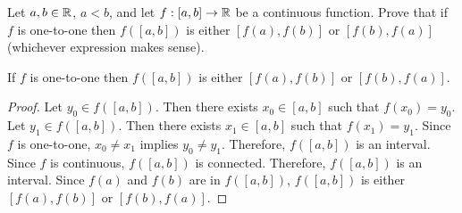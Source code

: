\begin{problem}
  Let $a, b \in \mathbb{R}$, $a < b$, and let $f : [a, b] \to \mathbb{R}$ be a continuous function.
  Prove that if $f$ is one-to-one then $f([a, b])$ is either
  $[f(a), f(b)]$ or $[f(b), f(a)]$ (whichever expression makes sense).
\end{problem}
\begin{answer}
  \begin{claim}
    If $f$ is one-to-one then $f([a, b])$ is either
    $[f(a), f(b)]$ or $[f(b), f(a)]$.
    \begin{proof}
      Let $y_0 \in f([a, b])$.
      Then there exists $x_0 \in [a, b]$ such that $f(x_0) = y_0$.
      Let $y_1 \in f([a, b])$.
      Then there exists $x_1 \in [a, b]$ such that $f(x_1) = y_1$.
      Since $f$ is one-to-one, $x_0 \neq x_1$ implies $y_0 \neq y_1$.
      Therefore, $f([a, b])$ is an interval.
      Since $f$ is continuous, $f([a, b])$ is connected.
      Therefore, $f([a, b])$ is an interval.
      Since $f(a)$ and $f(b)$ are in $f([a, b])$,
      $f([a, b])$ is either $[f(a), f(b)]$ or $[f(b), f(a)]$.
    \end{proof}
  \end{claim}
\end{answer}

